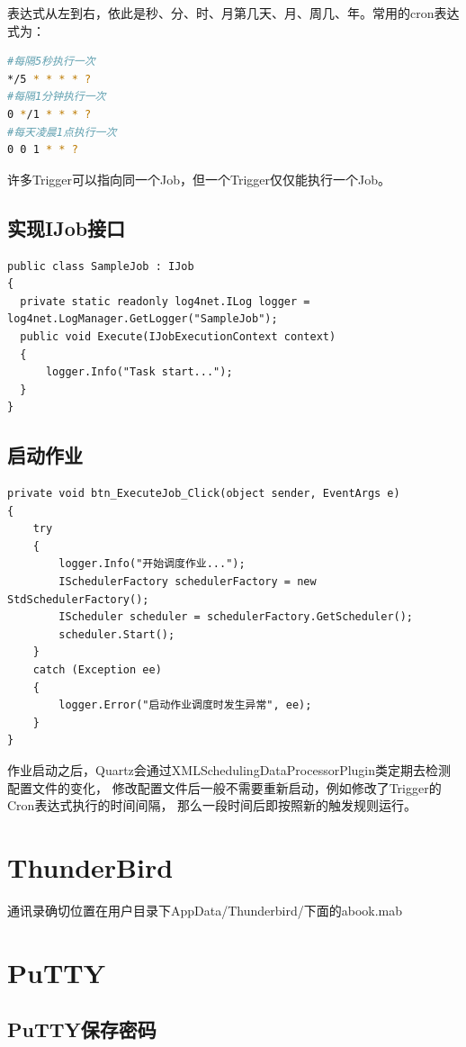 \documentclass{book}
\begin{document}
表达式从左到右，依此是秒、分、时、月第几天、月、周几、年。常用的cron表达式为：

\begin{lstlisting}[language=Bash]
#每隔5秒执行一次
*/5 * * * * ?
#每隔1分钟执行一次
0 */1 * * * ?
#每天凌晨1点执行一次
0 0 1 * * ?
\end{lstlisting}

许多Trigger可以指向同一个Job，但一个Trigger仅仅能执行一个Job。

\subsection{实现IJob接口}

\begin{lstlisting}
public class SampleJob : IJob
{
  private static readonly log4net.ILog logger = log4net.LogManager.GetLogger("SampleJob");
  public void Execute(IJobExecutionContext context)
  {
      logger.Info("Task start...");
  }
}
\end{lstlisting}

\subsection{启动作业}

\begin{lstlisting}
private void btn_ExecuteJob_Click(object sender, EventArgs e)
{
	try
	{
		logger.Info("开始调度作业...");
		ISchedulerFactory schedulerFactory = new StdSchedulerFactory();
		IScheduler scheduler = schedulerFactory.GetScheduler();
		scheduler.Start();
	}
	catch (Exception ee)
	{
		logger.Error("启动作业调度时发生异常", ee);
	}
}
\end{lstlisting}

作业启动之后，Quartz会通过XMLSchedulingDataProcessorPlugin类定期去检测配置文件的变化，
修改配置文件后一般不需要重新启动，例如修改了Trigger的Cron表达式执行的时间间隔，
那么一段时间后即按照新的触发规则运行。

\section{ThunderBird}

通讯录确切位置在用户目录下AppData/Thunderbird/下面的abook.mab

\section{PuTTY}

\subsection{PuTTY保存密码}
\end{document}
